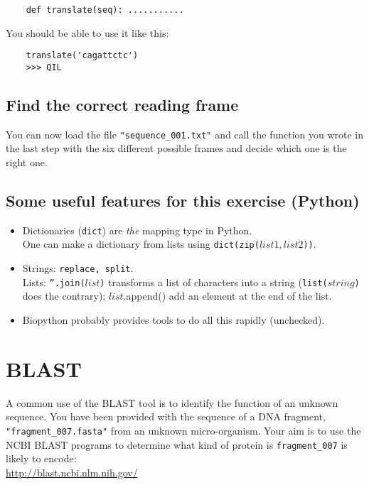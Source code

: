 \documentclass[a4paper,11pt]{article}
\begin{document}
\begin{verbatim}
	def translate(seq): ...........
\end{verbatim}

You should be able to use it like this:
\begin{verbatim}
	translate('cagattctc')
	>>> QIL
\end{verbatim}

\subsection{Find the correct reading frame}
You can now load the file \texttt{"sequence\_001.txt"} and call the function you wrote in the last step with the six different possible frames and decide which one is the right one.

\subsection{Some useful features for this exercise (Python)}
\begin{itemize}
\item Dictionaries (\texttt{dict}) are \textit{the} mapping type in Python. \\
	  One can make a dictionary from lists using \texttt{dict(zip(}$list1,list2$\texttt{))}.
\item Strings: \texttt{replace, split}. \\
	  Lists: \texttt{''.join(}$list$\texttt{)} transforms a list of characters into a string (\texttt{list(}$string$\texttt{)} does the contrary); $list$.append() add an element at the end of the list.
\item Biopython probably provides tools to do all this rapidly (unchecked).
\end{itemize}


\section{BLAST}
A common use of the BLAST tool is to identify the function of an unknown sequence. You have been provided with the sequence of a DNA fragment, \texttt{"fragment\_007.fasta"} from an unknown micro-organism. Your aim is to use the NCBI BLAST programs to determine what kind of protein is \texttt{fragment\_007} is likely to encode:\\

\url{http://blast.ncbi.nlm.nih.gov/}
\end{document}
